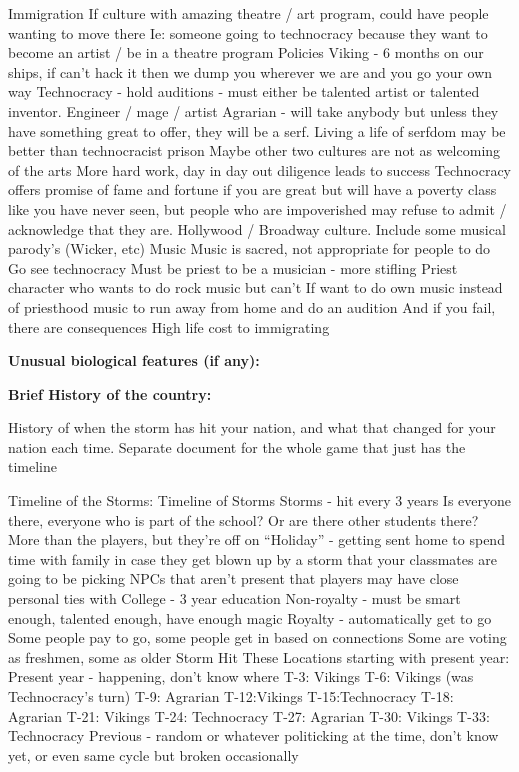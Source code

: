 \documentclass[blue]{GL2020}
\begin{document}
Immigration
If culture with amazing theatre / art program, could have people wanting to move there
Ie: someone going to technocracy because they want to become an artist / be in a theatre program
Policies
Viking - 6 months on our ships, if can’t hack it then we dump you wherever we are and you go your own way
Technocracy - hold auditions - must either be talented artist or talented inventor.  Engineer / mage / artist
Agrarian - will take anybody but unless they have something great to offer, they will be a serf.  Living a life of serfdom may be better than technocracist prison
Maybe other two cultures are not as welcoming of the arts
More hard work, day in day out diligence leads to success
Technocracy offers promise of fame and fortune if you are great but will have a poverty class like you have never seen, but people who are impoverished may refuse to admit / acknowledge that they are.  Hollywood / Broadway culture.  Include some musical parody’s (Wicker, etc)
Music
Music is sacred, not appropriate for people to do
Go see technocracy 
Must be priest to be a musician - more stifling
Priest character who wants to do rock music but can’t
If want to do own music instead of priesthood music to run away from home and do an audition
And if you fail, there are consequences
High life cost to immigrating

\textbf{Unusual biological features (if any):}

\textbf{Brief History of the country:}

History of when the storm has hit your nation, and what that changed for your nation each time.
Separate document for the whole game that just has the timeline

Timeline of the Storms:
Timeline of Storms
Storms - hit every 3 years
Is everyone there, everyone who is part of the school?  Or are there other students there?
More than the players, but they’re off on “Holiday” - getting sent home to spend time with family in case they get blown up by a storm that your classmates are going to be picking
NPCs that aren’t present that players may have close personal ties with
College - 3 year education
Non-royalty - must be smart enough, talented enough, have enough magic
Royalty - automatically get to go
Some people pay to go, some people get in based on connections
Some are voting as freshmen, some as older
Storm Hit These Locations starting with present year:
Present year - happening, don’t know where
T-3: Vikings
T-6: Vikings (was Technocracy’s turn)
T-9: Agrarian
T-12:Vikings
T-15:Technocracy
T-18: Agrarian
T-21: Vikings
T-24: Technocracy
T-27: Agrarian
T-30: Vikings
T-33: Technocracy
Previous - random or whatever politicking at the time, don’t know yet, or even same cycle but broken occasionally
\end{document}
